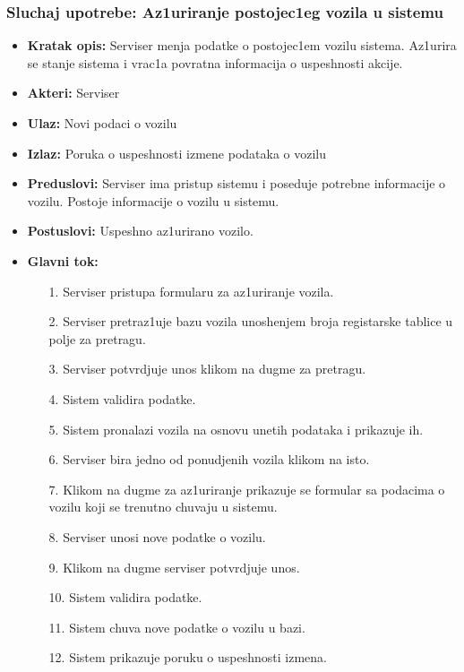 \subsubsection{Sluchaj upotrebe: Az1uriranje postojec1eg vozila u sistemu}

\begin{itemize}
\item{\textbf{Kratak opis:} Serviser menja podatke o postojec1em vozilu sistema. Az1urira se stanje sistema i vrac1a povratna informacija o uspeshnosti akcije.}
\item{\textbf{Akteri:} Serviser}
\item{\textbf{Ulaz:} Novi podaci o vozilu }
\item{\textbf{Izlaz:} Poruka o uspeshnosti izmene podataka o  vozilu }
\item{\textbf{Preduslovi:} Serviser ima pristup sistemu i poseduje potrebne informacije o vozilu. Postoje informacije o vozilu u sistemu.}
\item{\textbf{Postuslovi:} Uspeshno az1urirano vozilo.}
\item{\textbf{Glavni tok:} 
\begin{enumerate}
    \item [1.] Serviser pristupa formularu za az1uriranje vozila.
    \item[2.] Serviser pretraz1uje bazu vozila unoshenjem broja registarske tablice u polje za pretragu.
    \item[3.] Serviser potvrdjuje unos klikom na dugme za pretragu.
    \item[4.] Sistem validira podatke.
    \item[5.] Sistem pronalazi vozila na osnovu unetih podataka i prikazuje ih.
    \item[6.] Serviser bira jedno od ponudjenih vozila klikom na isto.
    \item[7.] Klikom na dugme za az1uriranje prikazuje se formular sa podacima o vozilu koji se trenutno chuvaju u sistemu.
    \item[8.] Serviser unosi nove podatke o vozilu.
    \item[9.] Klikom na dugme serviser potvrdjuje unos.
    \item[10.] Sistem validira podatke.
    \item[11.] Sistem chuva nove podatke o vozilu u bazi.
    \item[12.] Sistem prikazuje poruku o uspeshnosti izmena.
\end{enumerate}

}
\end{itemize}
